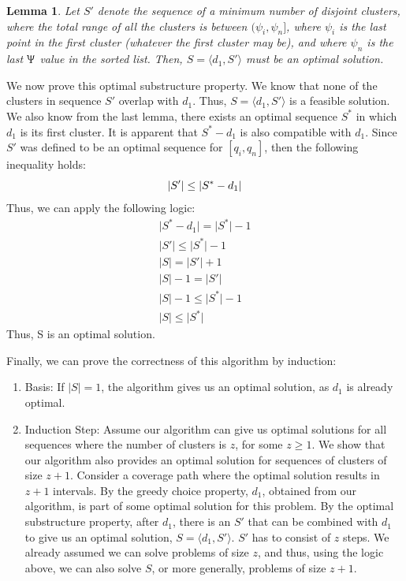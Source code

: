 \documentclass[conference]{IEEEtran}
\theoremstyle{plain}%
\newtheorem{lemma}[theorem]{Lemma}
\begin{document}
\begin{lemma} %
Let $S'$ denote the sequence of a minimum number of disjoint clusters, where the total range of all the clusters is between $(\psi_i, \psi_n]$, where $\psi_i$ is the last point in the first cluster (whatever the first cluster may be), and where $\psi_n$ is the last $\Uppsi$ value in the sorted list. Then, $S = \langle d_1, S' \rangle$ must be an optimal solution.
\end{lemma}
We now prove this optimal substructure property. We know that none of the clusters in sequence $S'$ overlap with $d_1$. Thus, $S = \langle d_1, S' \rangle$ is a feasible solution. We also know from the last lemma, there exists an optimal sequence $S^*$ in which $d_1$ is its first cluster. It is apparent that $S^* - d_1$ is also compatible with $d_1$. Since $S'$ was defined to be an optimal sequence for $[q_i, q_n]$, then the following inequality holds:
\begin{equation*}
\lvert S' \rvert \leq \lvert S^* - d_1 \rvert \\
\end{equation*}
Thus, we can apply the following logic:
\begin{gather*}
\lvert S^* - d_1 \rvert = \lvert S^* \rvert -1 \\
\lvert S' \rvert \leq \lvert S^* \rvert -1 \\
\lvert S \rvert = \lvert S' \rvert + 1 \\
\lvert S \rvert -1 = \lvert S' \rvert \\
\lvert S \rvert -1 \leq \lvert S^* \rvert -1 \\
\lvert S \rvert \leq \lvert S^* \rvert 
\end{gather*}
Thus, S is an optimal solution.

Finally, we can prove the correctness of this algorithm by induction:
\begin{enumerate}
\item Basis: If $\lvert S \rvert = 1$, the algorithm gives us an optimal solution, as $d_1$ is already optimal.
\item Induction Step: Assume our algorithm can give us optimal solutions for all sequences where the number of clusters is $z$, for some $z \geq 1$. We show that our algorithm also provides an optimal solution for sequences of clusters of size $z+1$. Consider a coverage path where the optimal solution results in $z+1$ intervals. By the greedy choice property, $d_1$, obtained from our algorithm, is part of some optimal solution for this problem. By the optimal substructure property, after $d_1$, there is an $S'$ that can be combined with $d_1$ to give us an optimal solution, $S=\langle d_1, S' \rangle$. $S'$ has to consist of $z$ steps. We already assumed we can solve problems of size $z$, and thus, using the logic above, we can also solve $S$, or more generally, problems of size $z+1$.
\end{enumerate}
\end{document}
